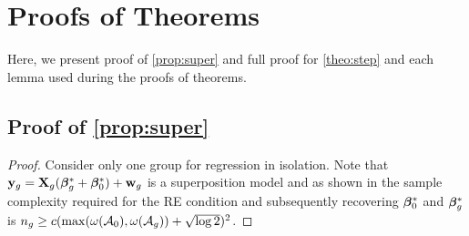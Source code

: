 \section{Proofs of Theorems}
\label{sec:dsproofs}
Here, we present proof of \cref{prop:super} and  full proof for \cref{theo:step} and each lemma used during the proofs of theorems. %
\subsection{Proof of \cref{prop:super}}
\begin{proof}
	Consider only one group for regression in isolation. 
	Note that $\mathbf{y}_g = \mathbf{X}_g (\boldsymbol{\beta} _g^* + \boldsymbol{\beta} _0^*) + \mathbf{w}_g$ is a superposition model and as shown in \cite{guba16} the sample complexity required for the RE condition and subsequently recovering $\boldsymbol{\beta} _0^*$ and $\boldsymbol{\beta} _g^*$ is $n_g  \geq c(\max(\omega(\cA_0), \omega(\cA_g) ) + \sqrt{\log 2})^2$.
\end{proof} 

